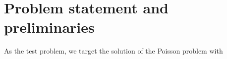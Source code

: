 \documentclass[smallcondensed,final]{svjour3}     %
\begin{document}




























\section{Problem statement and preliminaries}

\label{sec:problem}



As the test problem, we target the solution of the Poisson problem with
\end{document}
